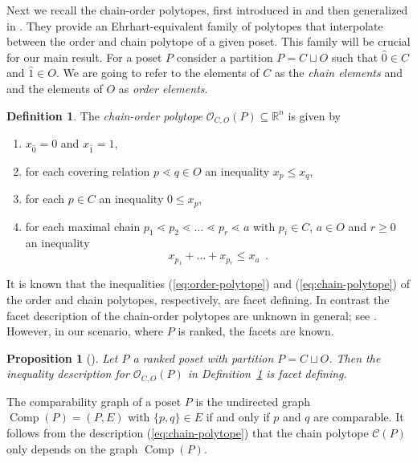 \documentclass[12pt,a4paper]{amsart}
\renewcommand{\prec}{\lessdot}
\newtheorem{proposition}[theorem]{Proposition}
\theoremstyle{definition}
\newtheorem{definition}[theorem]{Definition}
\newcommand{\OP}{\mathcal{O}}
\newcommand{\CP}{\mathcal{C}}
\newcommand{\R}{\mathbb{R}}
\newcommand{\comp}{{\operatorname*{Comp}}}
\begin{document}
Next we recall the chain-order polytopes, first introduced in \cite{FF16-Mark} and then generalized in \cite{FFLP, FFP20}.
They provide an Ehrhart-equivalent family of polytopes that interpolate between the order and chain polytope of a given poset.
This family will be crucial for our main result.
For a poset $P$ consider a partition $P=C\sqcup O$ such that $\hat{0}\in C$ and $\hat{1}\in O$.
We are going to refer to the elements of $C$ as the \textit{chain elements} and and the elements of $O$ as \textit{order elements}.
\begin{definition}\label{def:chain-order-polytope}
The \emph{chain-order polytope} $\OP_{C,O}(P)\subseteq\R^{n}$ is given by
\begin{enumerate}
%
\item{$x_{\hat{0}}=0$ and $x_{\hat{1}}=1$,}
%
\item{for each covering relation $p \prec q \in  O$ an inequality $x_p \leq x_q$,}
\item{for each $p \in  C$  an inequality $0\leq x_p$,}
\item{for each maximal chain $p_1 \prec  p_2 \prec \dots \prec  p_r \prec a$ with $p_i \in  C$, $a\in O$ and $r \geq  0$ an inequality
\begin{equation*}
  x_{p_{1}} +\dots +x_{p_{r}} \leq x_a \enspace.
\end{equation*}}
\end{enumerate}
\end{definition}

It is known that the inequalities (\ref{eq:order-polytope}) and (\ref{eq:chain-polytope}) of the order and chain polytopes, respectively, are facet defining.
In contrast the facet description of the chain-order polytopes are unknown in general; see \cite[Conjecture 8.2]{FFLP}.
However, in our scenario, where $P$ is ranked, the facets are known.
\begin{proposition}[{\cite[Proposition 8.6]{FFLP}}]\label{prop-tame-facet}
  Let $P$ a ranked poset with partition $P=C\sqcup O$.
  Then the inequality description for $\OP_{C,O}(P)$ in Definition~\ref{def:chain-order-polytope} is facet defining.
\end{proposition}
The comparability graph of a poset $P$ is the undirected graph $\comp(P)=(P,E)$ with $\{p,q\}\in E$ if and only if $p$ and $q$ are comparable.
It follows from the description (\ref{eq:chain-polytope}) that the chain polytope $\CP(P)$ only depends on the graph $\comp(P)$.
\end{document}

